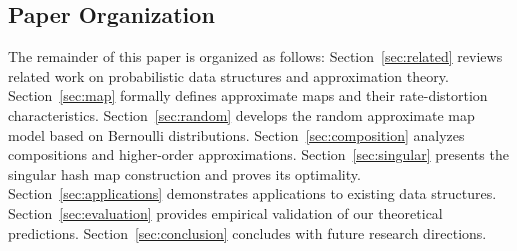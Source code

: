 \subsection{Paper Organization}

The remainder of this paper is organized as follows:
Section~\ref{sec:related} reviews related work on probabilistic data structures and approximation theory.
Section~\ref{sec:map} formally defines approximate maps and their rate-distortion characteristics.
Section~\ref{sec:random} develops the random approximate map model based on Bernoulli distributions.
Section~\ref{sec:composition} analyzes compositions and higher-order approximations.
Section~\ref{sec:singular} presents the singular hash map construction and proves its optimality.
Section~\ref{sec:applications} demonstrates applications to existing data structures.
Section~\ref{sec:evaluation} provides empirical validation of our theoretical predictions.
Section~\ref{sec:conclusion} concludes with future research directions.